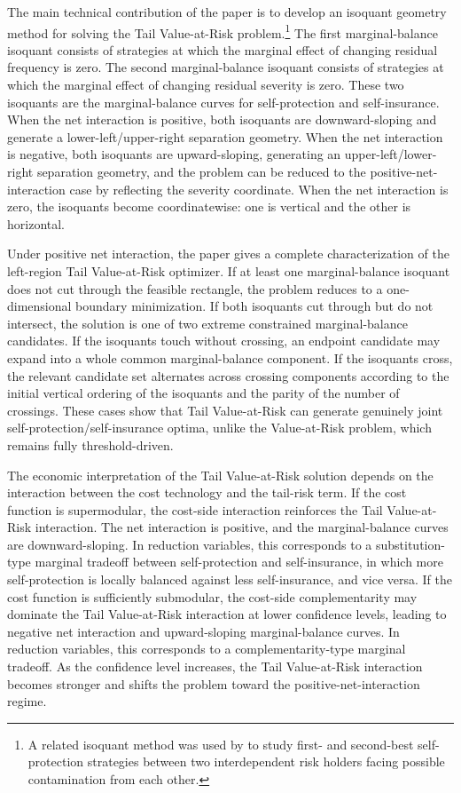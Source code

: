 \documentclass[a4paper,12pt]{article}
\begin{document}
The main technical contribution of the paper is to develop an isoquant geometry method for solving the Tail Value-at-Risk problem.\footnote{A related isoquant method was used by \cite{MuermannKunreuther2008} to study first- and second-best self-protection strategies between two interdependent risk holders facing possible contamination from each other.} The first marginal-balance isoquant consists of strategies at which the marginal effect of changing residual frequency is zero. The second marginal-balance isoquant consists of strategies at which the marginal effect of changing residual severity is zero. These two isoquants are the marginal-balance curves for self-protection and self-insurance. When the net interaction is positive, both isoquants are downward-sloping and generate a lower-left/upper-right separation geometry. When the net interaction is negative, both isoquants are upward-sloping, generating an upper-left/lower-right separation geometry, and the problem can be reduced to the positive-net-interaction case by reflecting the severity coordinate. When the net interaction is zero, the isoquants become coordinatewise: one is vertical and the other is horizontal.

Under positive net interaction, the paper gives a complete characterization of the left-region Tail Value-at-Risk optimizer. If at least one marginal-balance isoquant does not cut through the feasible rectangle, the problem reduces to a one-dimensional boundary minimization. If both isoquants cut through but do not intersect, the solution is one of two extreme constrained marginal-balance candidates. If the isoquants touch without crossing, an endpoint candidate may expand into a whole common marginal-balance component. If the isoquants cross, the relevant candidate set alternates across crossing components according to the initial vertical ordering of the isoquants and the parity of the number of crossings. These cases show that Tail Value-at-Risk can generate genuinely joint self-protection/self-insurance optima, unlike the Value-at-Risk problem, which remains fully threshold-driven.

The economic interpretation of the Tail Value-at-Risk solution depends on the interaction between the cost technology and the tail-risk term. If the cost function is supermodular, the cost-side interaction reinforces the Tail Value-at-Risk interaction. The net interaction is positive, and the marginal-balance curves are downward-sloping. In reduction variables, this corresponds to a substitution-type marginal tradeoff between self-protection and self-insurance, in which more self-protection is locally balanced against less self-insurance, and vice versa. If the cost function is sufficiently submodular, the cost-side complementarity may dominate the Tail Value-at-Risk interaction at lower confidence levels, leading to negative net interaction and upward-sloping marginal-balance curves. In reduction variables, this corresponds to a complementarity-type marginal tradeoff. As the confidence level increases, the Tail Value-at-Risk interaction becomes stronger and shifts the problem toward the positive-net-interaction regime.
\end{document}
